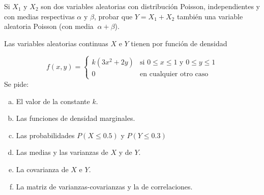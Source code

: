 \documentclass[12pt]{article}
\begin{document}
  \begin{prob}  Si $X_1 \mbox{ y } X_2 $ son dos  variables aleatorias con distribución Poisson,
   independientes y con medias respectivas $\alpha \mbox{ y } \beta$, probar que $Y = X_1 +
X_2 $ también una variable aleatoria Poisson (con media $\> \alpha + \beta$).

\end{prob}

    \begin{prob}
Las variables aleatorias continuas $X$ e $Y$ tienen por función de densidad

$$
f(x,y)=\left\{\begin{array}{ll} k(3x^2+2y) & \mbox{si } 0\leq x \leq 1 \mbox{ y }  0\leq y
\leq 1\\ 0 & \mbox{en cualquier otro caso}
\end{array}\right.
$$
Se pide:
\begin{enumerate}[a)]
    \item El valor de la constante $k$.
    \item Las funciones de densidad marginales.
    \item Las probabilidades $P(X\leq 0.5)$ y $P(Y\leq 0.3)$
    \item Las medias y las varianzas  de $X$ y de $Y$.
    \item La covarianza de $X$ e $Y$.
    \item La matriz de varianzas-covarianzas y la de correlaciones.
    \end{enumerate}
\end{prob}
\end{document}
